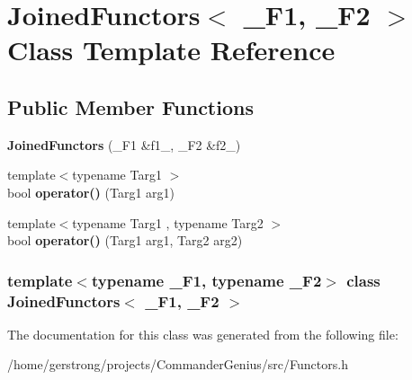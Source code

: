 \hypertarget{class_joined_functors}{
\section{JoinedFunctors$<$ \_\-F1, \_\-F2 $>$ Class Template Reference}
\label{class_joined_functors}
}
\subsection*{Public Member Functions}
\begin{DoxyCompactItemize}
\item 
\hypertarget{class_joined_functors_a88f0dc52f774127e723113e175b84b8c}{
{\bfseries JoinedFunctors} (\_\-F1 \&f1\_\-, \_\-F2 \&f2\_\-)}
\label{class_joined_functors_a88f0dc52f774127e723113e175b84b8c}

\item 
\hypertarget{class_joined_functors_a430a7668d18a259275ef08b81b5f5c13}{
{\footnotesize template$<$typename Targ1 $>$ }\\bool {\bfseries operator()} (Targ1 arg1)}
\label{class_joined_functors_a430a7668d18a259275ef08b81b5f5c13}

\item 
\hypertarget{class_joined_functors_aeac337e1d7ecf1110581f14954e895ce}{
{\footnotesize template$<$typename Targ1 , typename Targ2 $>$ }\\bool {\bfseries operator()} (Targ1 arg1, Targ2 arg2)}
\label{class_joined_functors_aeac337e1d7ecf1110581f14954e895ce}

\end{DoxyCompactItemize}
\subsubsection*{template$<$typename \_\-F1, typename \_\-F2$>$ class JoinedFunctors$<$ \_\-F1, \_\-F2 $>$}



The documentation for this class was generated from the following file:\begin{DoxyCompactItemize}
\item 
/home/gerstrong/projects/CommanderGenius/src/Functors.h\end{DoxyCompactItemize}
